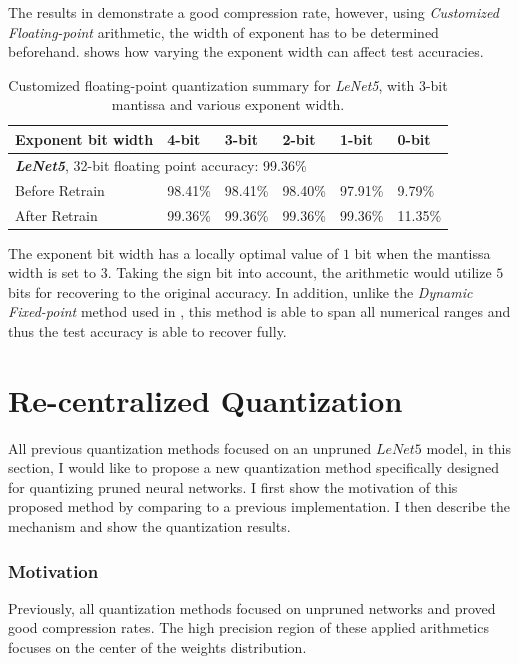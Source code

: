 \documentclass[a4paper,12pt]{report}
\begin{document}
The results in  demonstrate a good compression rate, however,
using \textit{Customized Floating-point} arithmetic, the width of exponent has
to be determined beforehand.
 shows how varying the exponent width can affect test
accuracies.
\begin{table}[!h]
  \centering
  \begin{tabular}{llllll}
    \hline
    \hline
    Exponent bit width               &4-bit     &3-bit     &2-bit     &1-bit      &0-bit    \\
    \hline
    \multicolumn{5}{l}{\textbf{\textit{LeNet5}}, 32-bit floating point accuracy: 99.36\%}\\
    \hline
    \hline
    Before Retrain          &98.41\%    &98.41\%    &98.40\%  &97.91\%      &9.79\%\\
    After Retrain           &99.36\%    &99.36\%    &99.36\%  &99.36\%     &11.35\%\\
    \hline
    \hline
  \end{tabular}
  \caption{Customized floating-point quantization summary for \textit{LeNet5}, with 3-bit mantissa and various exponent width.}
  \label{tab:cfp_exp_sum}
\end{table}

The exponent bit width has a locally optimal value of $1$ bit when the
mantissa width is set to $3$.
Taking the sign bit into account, the arithmetic would utilize $5$ bits for
recovering to the original accuracy.
In addition, unlike the \textit{Dynamic Fixed-point} method used in ,
this method is able to span all numerical ranges and thus the test accuracy is
able to recover fully.

\section{Re-centralized Quantization}
All previous quantization methods focused on an unpruned $LeNet5$ model, in this
section, I would like to propose a new quantization method specifically designed
for quantizing pruned neural networks.
I first show the motivation of this proposed method by comparing to a previous
implementation.
I then describe the mechanism and show the quantization results.

\subsubsection{Motivation}

Previously, all quantization methods focused on unpruned networks and proved
good compression rates.
The high precision region of these applied arithmetics focuses on the center of
the weights distribution.
\end{document}
